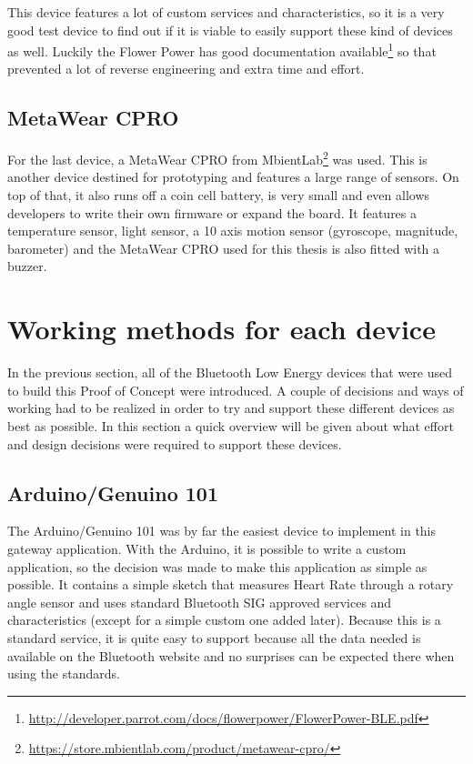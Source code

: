 \documentclass[pdftex,a4paper,12pt,twoside]{report}
\begin{document}
This device features a lot of custom services and characteristics, so it is a very good test device to find out if it is viable to easily support these kind of devices as well. Luckily the Flower Power has good documentation available\footnote{\url{http://developer.parrot.com/docs/flowerpower/FlowerPower-BLE.pdf}} so that prevented a lot of reverse engineering and extra time and effort.

\subsection{MetaWear CPRO}
\label{subsec:metawearcpro}
For the last device, a MetaWear CPRO from MbientLab\footnote{\url{https://store.mbientlab.com/product/metawear-cpro/}} was used. This is another device destined for prototyping and features a large range of sensors. On top of that, it also runs off a coin cell battery, is very small and even allows developers to write their own firmware or expand the board. It features a temperature sensor, light sensor, a 10 axis motion sensor (gyroscope, magnitude, barometer) and the MetaWear CPRO used for this thesis is also fitted with a buzzer.

\section{Working methods for each device}
\label{sec:achievements}
In the previous section, all of the Bluetooth Low Energy devices that were used to build this Proof of Concept were introduced. A couple of decisions and ways of working had to be realized in order to try and support these different devices as best as possible. In this section a quick overview will be given about what effort and design decisions were required to support these devices.

\subsection{Arduino/Genuino 101}
\label{subsec:achievementsarduino101}
The Arduino/Genuino 101 was by far the easiest device to implement in this gateway application. With the Arduino, it is possible to write a custom application, so the decision was made to make this application as simple as possible. It contains a simple sketch that measures Heart Rate through a rotary angle sensor and uses standard Bluetooth SIG approved services and characteristics (except for a simple custom one added later). Because this is a standard service, it is quite easy to support because all the data needed is available on the Bluetooth website and no surprises can be expected there when using the standards.
\end{document}
